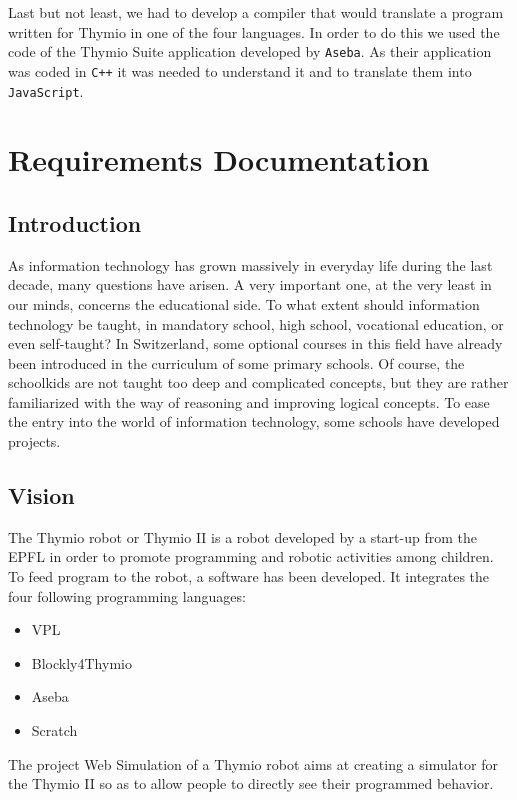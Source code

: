 \documentclass{scrreprt}
\begin{document}
Last but not least, we had to develop a compiler that would translate a program written for Thymio in one of the four languages. In order to do this we used the code of the Thymio Suite application developed by \texttt{Aseba}. 
As their application was coded in \texttt{C++} it was needed to understand it and to translate them into \texttt{JavaScript}. 

\clearpage

\tableofcontents
\clearpage

\chapter{Requirements Documentation}
\section{Introduction}

As information technology has grown massively in everyday life during the last decade, many questions have arisen. A very important one, at the very least in our minds, concerns the educational side. 
To what extent should information technology be taught, in mandatory school, high school, vocational education, or even self-taught? In Switzerland, some optional courses in this field have already been introduced in the curriculum of some primary schools. 
Of course, the schoolkids are not taught too deep and complicated concepts, but they are rather familiarized with the way of reasoning and improving logical concepts. To ease the entry into the world of information technology, some schools have developed projects. 

\section{Vision}

The Thymio robot or Thymio II is a robot developed by a start-up from the EPFL in order to promote programming and robotic activities among children. 
To feed program to the robot, a software has been developed. It integrates the four following programming languages: 
\begin{itemize}
  \item VPL
  \item Blockly4Thymio
  \item Aseba
  \item Scratch
\end{itemize}

The project Web Simulation of a Thymio robot aims at creating a simulator for the Thymio II so as to allow people to directly see their programmed behavior.
\end{document}
